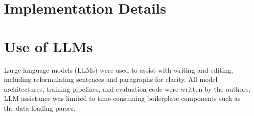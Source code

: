 \documentclass{article}
\begin{document}
\section{Implementation Details}

\section{Use of LLMs}
Large language models (LLMs) were used to assist with writing and editing, including reformulating sentences and paragraphs for clarity.
All model architectures, training pipelines, and evaluation code were written by the authors; LLM assistance was limited to time-consuming boilerplate components such as the data-loading parser.
\end{document}

